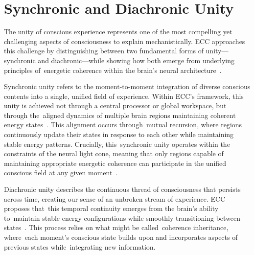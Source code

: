 \section{Synchronic and Diachronic Unity~}

The unity of conscious experience represents one of the most compelling yet challenging aspects of consciousness to explain mechanistically. ECC approaches this challenge by distinguishing between two fundamental forms of unity—synchronic and diachronic—while showing how both emerge from underlying principles of~energetic coherence within the brain's neural architecture~\cite{bayne2010unity, bayne2003unity}.

Synchronic unity refers to the moment-to-moment integration of diverse conscious contents into a single, unified field of experience. Within ECC's framework, this unity is achieved not through a central processor or global workspace, but through the~aligned dynamics of multiple brain regions maintaining coherent energy states~\cite{pinotsis2023cytoelectric}. This alignment occurs through~mutual recursion, where regions continuously update their states in response to each other while maintaining stable energy patterns. Crucially, this~synchronic unity operates within the constraints of the neural light cone, meaning that only regions capable of maintaining appropriate energetic coherence can participate in the unified conscious field at any given moment~\cite{zheng2025unbearable}.

Diachronic unity describes the continuous thread of consciousness that persists across time, creating our sense of an unbroken stream of experience. ECC proposes that~this temporal continuity emerges from the brain's ability to~maintain stable energy configurations while smoothly transitioning between states~\cite{van2025processes}. This process relies on what might be called~coherence inheritance, where~each moment's conscious state builds upon and incorporates aspects of previous states while~integrating new information.

